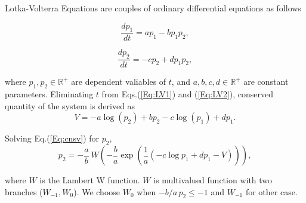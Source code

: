 \documentclass[a4j]{article}
\begin{document}
    Lotka-Volterra Equations\cite{wikilv, wollv} are couples of ordinary differential equations as follows

    \begin{equation}
        \label{Eq:LV1}
        \frac{dp_1}{dt} = a p_1 -b p_1 p_2, 
    \end{equation}

    \begin{equation}
        \label{Eq:LV2}
        \frac{dp_2}{dt} = -c p_2 + d p_1 p_2, 
    \end{equation}

    where $p_1, p_2 \in \mathbb{R}^+ $ are dependent valiables of $t$, and $a, b, c, d \in \mathbb{R}^+ $ are constant parameters. Eliminating $t$ from Eqs.(\ref{Eq:LV1}) and (\ref{Eq:LV2}), conserved quantity of the system is derived as 
    \begin{equation}
        \label{Eq:cnsv}
        V = -a \log(p_2) + b p_2 -c \log(p_1) + d p_1.
    \end{equation}

    Solving Eq.(\ref{Eq:cnsv}) for $p_2$,  
    \begin{equation}
        p_2 = -\frac{a}{b} \:
            W \left( -\frac{b}{a} \exp \left(
            \frac{1}{a} \left(-c \log p_1 + d p_1 -V 
            \right) \right) \right),
    \end{equation}

    where $W$ is the Lambert W function\cite{wikilam}. 
    $W$ is multivalued function with two branches ($W_{-1}, W_{0}$). 
    We choose $W_0$ when $-b/a \, p_2 \leq -1$ and $W_{-1}$ for other case.

    
\end{document}
